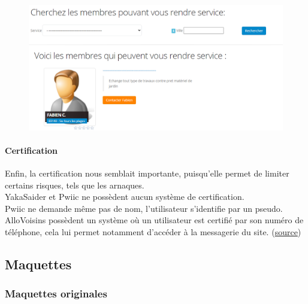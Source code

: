 \documentclass[a4paper,11pt]{article}
\begin{document}
\begin{figure}[H]
  \includegraphics[width=\linewidth]{images/erreur-yakasaider.png}
  \label{fig:erreur-yakasaider}
\end{figure}

\paragraph{Certification}

Enfin, la certification nous semblait importante, puisqu’elle permet de limiter certains risques, tels que les arnaques.\\

YakaSaider et Pwiic ne possèdent aucun système de certification.\\

Pwiic ne demande même pas de nom, l’utilisateur s’identifie par un pseudo.\\

AlloVoisins possèdent un système où un utilisateur est certifié par son numéro de téléphone,
cela lui permet notamment d’accéder à la messagerie du site. (\href{https://support.allovoisins.com/hc/fr/articles/360000816614-Pourquoi-dois-je-certifier-mon-num%C3%A9ro-de-mobile-pour-pouvoir-acc%C3%A9der-%C3%A0-la-messagerie-}{source})

\subsection{Maquettes}
\label{sec:maquettes-annexe}

\subsubsection{Maquettes originales}
\end{document}
